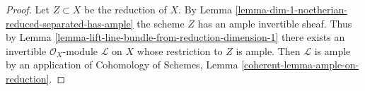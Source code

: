 \documentclass[10pt,a4paper]{amsart}
\theoremstyle{plain}
\theoremstyle{definition}
\theoremstyle{remark}
\numberwithin{equation}{subsection}
\begin{document}
\begin{proof}
Let $Z \subset X$ be the reduction of $X$. By
Lemma \ref{lemma-dim-1-noetherian-reduced-separated-has-ample}
the scheme $Z$ has an ample invertible sheaf.
Thus by Lemma \ref{lemma-lift-line-bundle-from-reduction-dimension-1}
there exists an invertible $\mathcal{O}_X$-module $\mathcal{L}$
on $X$ whose restriction to $Z$ is ample.
Then $\mathcal{L}$ is ample by an application of
Cohomology of Schemes, Lemma \ref{coherent-lemma-ample-on-reduction}.
\end{proof}
\end{document}
